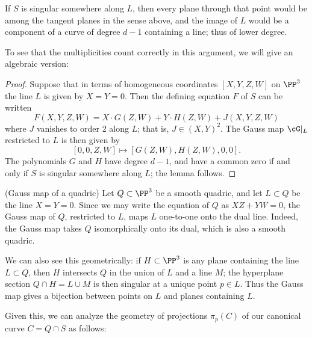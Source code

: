 If $S$ is singular somewhere along $L$, then every plane through that point would be among the tangent
planes in the sense above, and the image of $L$ would be a component of a curve of degree $d-1$ containing a line; thus of lower degree.

To see that the multiplicities count correctly in this argument, we will give an algebraic version:

\begin{proof}

Suppose that in terms of homogeneous coordinates $[X,Y,Z,W]$ on $\PP^3$ the line $L$ is given by $X = Y = 0$. Then the defining equation $F$ of $S$ can be written
$$
F(X,Y,Z,W) = X\cdot G(Z,W) + Y\cdot H(Z,W) + J(X,Y,Z,W)
$$
where $J$ vanishes to order 2 along $L$; that is, $J \in (X,Y)^2$. The Gauss map $\cG|_L$ restricted to $L$ is then given by
$$
[0,0,Z,W] \mapsto [G(Z,W), H(Z,W), 0, 0].
$$
The polynomials $G$ and $H$ have degree $d-1$, and have a common zero if and only if $S$ is singular somewhere along $L$; the lemma follows.
\end{proof}

\begin{example} (Gauss map of a quadric)\label{Gauss of Quadric}
 Let $Q\subset \PP^3$ be a smooth quadric, and let $L\subset Q$ be the line $X=Y =0$. Since we may write the equation of $Q$ as $XZ+YW = 0$, the Gauss map of $Q$, restricted to $L$, maps $L$ one-to-one onto the dual line. Indeed, the Gauss map takes $Q$ isomorphically onto its dual, which is also a smooth quadric.
 
 We can also see this geometrically: if $H \subset \PP^3$ is any plane containing the line $L \subset Q$, then $H$ intersects $Q$ in the union of $L$ and a line $M$; the hyperplane section $Q \cap H = L \cup M$ is then singular at a unique point $p \in L$. Thus the Gauss map gives a bijection between points on $L$ and planes containing $L$. 
\end{example}

Given this, we can analyze the geometry of projections $\pi_p(C)$ of our canonical curve $C = Q \cap S$ as follows:

